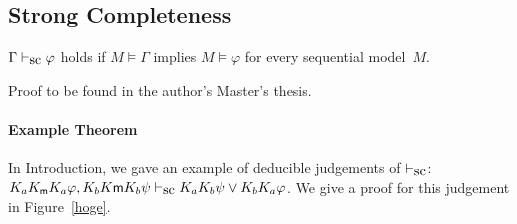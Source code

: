   \subsection{Strong Completeness}
  \begin{proposition}
   \label{sc-comp}
   $\Gamma\vdash_{\mbox{\rm sc}}\varphi$ holds if $M\models \Gamma$ implies $M\models\varphi$ for every
   sequential model~$M$.
  \end{proposition}
  Proof to be found in the author's Master's thesis.


    \paragraph{Example Theorem}

    In Introduction, we gave an example of deducible judgements of $\vdash_{\mbox{\rm sc}}$:\\
    $K_aK_{\sf m}{}K_a\varphi,
    K_bK{\sf m}{}K_b\psi\vdash_{\mbox{\rm sc}} K_aK_b\psi\vee K_bK_a\varphi$.
    We give a proof for this judgement in Figure~\ref{hoge}.
